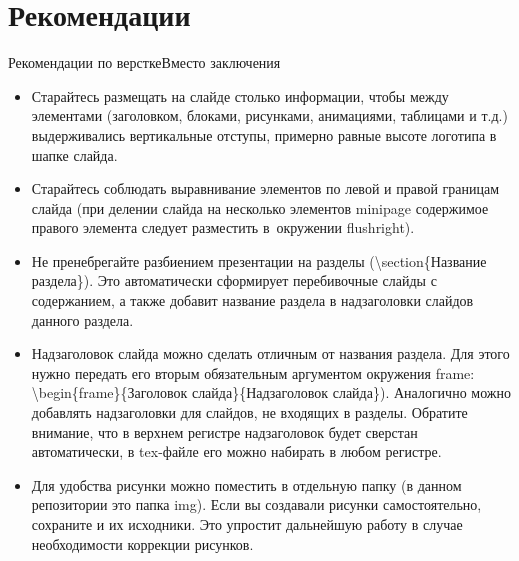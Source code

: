 \documentclass{YourPres}
\begin{document}
  \section{Рекомендации}

  \begin{frame}{Рекомендации по верстке}{Вместо заключения}
    \begin{itemize}
      \item Старайтесь размещать на слайде столько информации, чтобы между элементами (заголовком, блоками, рисунками, анимациями, таблицами и т.д.) выдерживались вертикальные отступы, примерно равные высоте логотипа в шапке слайда.\\
      \item Старайтесь соблюдать выравнивание элементов по левой и правой границам слайда (при делении слайда на несколько элементов {\Yourcode minipage} содержимое правого элемента следует разместить в~окружении {\Yourcode flushright}). \\
      \item Не пренебрегайте разбиением презентации на разделы ({\Yourcode \textbackslash section\{Название раздела\}}). Это автоматически сформирует перебивочные слайды с содержанием, а также добавит название раздела в надзаголовки слайдов данного раздела.\\
      \item Надзаголовок слайда можно сделать отличным от названия раздела. Для этого нужно передать его вторым обязательным аргументом окружения {\Yourcode frame}: {\Yourcode \textbackslash begin\{frame\}\{Заголовок слайда\}\{Надзаголовок слайда\}}). Аналогично можно добавлять надзаголовки для слайдов, не входящих в разделы. Обратите внимание, что в верхнем регистре надзаголовок будет сверстан автоматически, в tex-файле его можно набирать в любом  регистре. \\
      \item Для удобства рисунки можно поместить в отдельную папку (в данном репозитории это папка img). Если вы создавали рисунки самостоятельно, сохраните и их исходники. Это упростит дальнейшую работу в случае необходимости коррекции рисунков.
    \end{itemize}
  \end{frame}

  \Yourfinalslide
\end{document}
